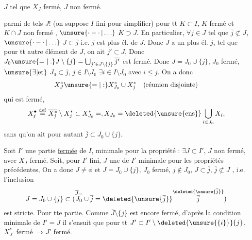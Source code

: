   $J$ tel que $X_J$ fermé, $J$ non fermé. 

parmi de tels $J$! (on suppose $I$ fini pour simplifier) 
pour tt $K\subset I$, $K$ fermé et $K\cap J$ non fermé , $\unsure{\mathinner{\cdot-\cdot}|\ldots}$ $K\supset J$.
En particulier, $\forall j\in J$ tel que $\overline j\not\subset J$, $\unsure{\mathinner{\cdot-\cdot}|\ldots}$ $J\subset\overline j$
i.e. $j$ est plus  él. de $J$. Donc $J$ a un plus 
él. $j$, tel que pour tt autre élément  de $J$, on ait
$\overline{j'}\subset J$, Donc 
$J_0\unsure{=|:}J\setminus\{j\}=\bigcup_{j'\in J\setminus\{j\}}\overline{j'}$ est fermé.
Donc $J=J_0\cup\{j\}$, $J_0$ fermé, $\unsure{\exists|\mathrm{et}}$ $J_0\subset\overline j$, $j\in I\setminus J_0$
$\exists i\in I\setminus J_0$ avec $i\leq j$.  On a donc
\[
X_J^*\unsure{=|:}X_{J_0}^*\cup X_j^*\quad(\text{réunion disjointe})
\]
qui est fermé, 
\[
X_j^\bullet\overset{\mathrm{def}}=\overline{X_j^*}\setminus X_j^*\subset X_{J_0}^*=,X_{J_0}=\deleted{\unsure{\mathrm{ens}}}\bigcup_{i\in J_0}X_i,
\]
sans qu'on ait
pour autant $\overline j\subset J_0\cup\{j\}$.

Soit $I'$ une partie \uline{fermée} de $I$, minimale pour la
propriété : $\exists J\subset I'$, $J$ non fermé, avec $X_J$ fermé. Soit, pour
$I'$ fini, $J$ une  de $I'$ minimale pour les propriétés précédentes,
On a donc $J\ne\phi$ et $J=J_0\cup\{j\}$, \deleted{$\unsure{\exists}$} $J_0$ fermé, $j\notin J_0$,
 $J\subset\overline j$, $\overline j\not\subset J$ , i.e. l'inclusion
\[
J=J_0\cup\{j\}\subset(\overset{\overline J=}{J_0}\cup\overline j=\deleted{\unsure{\overline j}}\overset{\deleted{\unsure{\overline j}}}{\overline j})
\]
est stricte.  Pour tte
partie. Comme  $\overline J\setminus\{j\}$ est encore fermé, d'après la condition
minimale de $I'=\overline J$ il s'ensuit que pour
 tt $J'\subset I'\setminus\deleted{\unsure{\{i\}}}\{j\}$, $X_{J'}^*$ fermé $\Rightarrow J'$ fermé. 

